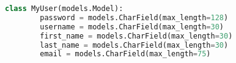 \begin{lstlisting}[language=Python,caption={Django user model},breaklines=true,label={lst:djangoModel}]
    class MyUser(models.Model):
        password = models.CharField(max_length=128)
        username = models.CharField(max_length=30)
        first_name = models.CharField(max_length=30)
        last_name = models.CharField(max_length=30)
        email = models.CharField(max_length=75)
\end{lstlisting}
